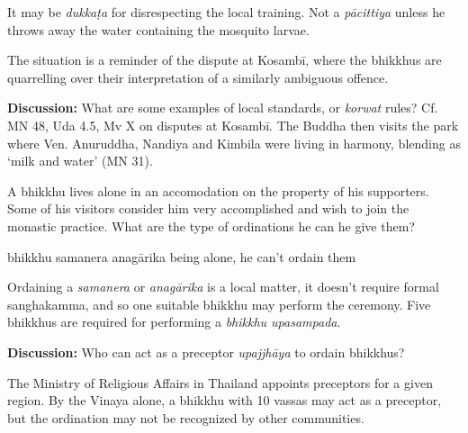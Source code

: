 \begin{exam}{\autoExamName}
\begin{problem}
\begin{solution}
  It may be \emph{dukkaṭa} for disrespecting the local training. Not a \emph{pācittiya}
  unless he throws away the water containing the mosquito larvae.

  The situation is a reminder of the dispute at Kosambī,
  where the bhikkhus are quarrelling over their interpretation of a similarly ambiguous offence.
\end{solution}

\end{problem}

\bigskip

\textbf{Discussion:} What are some examples of local standards, or \emph{korwat}
rules? Cf. MN 48, Uda 4.5, Mv X on disputes at Kosambī. The Buddha then visits
the park where Ven. Anuruddha, Nandiya and Kimbila were living in harmony,
blending as `milk and water' (MN 31).

\problemDivide

\begin{problem}

  A bhikkhu lives alone in an accomodation on the property of his supporters. Some of
  his visitors consider him very accomplished and wish to join the monastic practice.
  What are the type of ordinations he can he give them?

  \bigskip

  \begin{manswers}{4}
    \bChoices
     bhikkhu\eAns
     samanera\eAns
     anagārika\eAns
     being alone, he can't ordain them\eAns
    \eChoices
  \end{manswers}

\begin{solution}
  Ordaining a \emph{samanera} or \emph{anagārika} is a local matter,
  it doesn't require formal sanghakamma, and so one suitable bhikkhu may perform the ceremony.
  Five bhikkhus are required for performing a \emph{bhikkhu upasampada}.
\end{solution}

\bigskip

\textbf{Discussion:} Who can act as a preceptor \emph{upajjhāya} to ordain bhikkhus?

\begin{solution}
  The Ministry of Religious Affairs in Thailand appoints preceptors for a given region.
  By the Vinaya alone, a bhikkhu with 10 vassas may act as a preceptor, but the
  ordination may not be recognized by other communities.
\end{solution}

\end{problem}

\end{exam}

